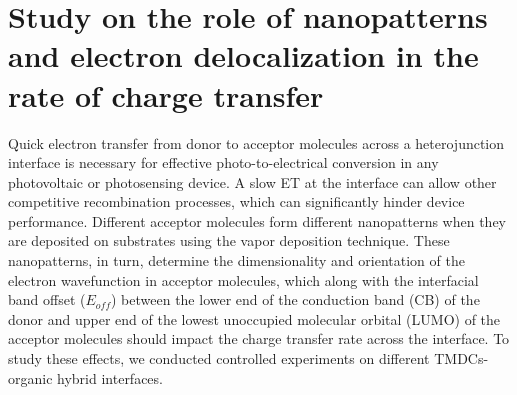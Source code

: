 \documentclass[12pt]{article}
\begin{document}
\section{Study on the role of nanopatterns and electron delocalization in the rate of charge transfer}
Quick electron transfer from donor to acceptor molecules across a heterojunction interface is necessary for effective photo-to-electrical conversion in any photovoltaic or photosensing device. A slow ET at the interface can allow other competitive recombination processes, which can significantly hinder device performance. Different acceptor molecules form different nanopatterns when they are deposited on substrates using the vapor deposition technique. These nanopatterns, in turn, determine the dimensionality and orientation of the electron wavefunction in acceptor molecules, which along with the interfacial band offset ($E_{off}$) between the lower end of the conduction band (CB) of the donor and upper end of the lowest unoccupied molecular orbital (LUMO) of the acceptor molecules should impact the charge transfer rate across the interface. To study these effects, we conducted controlled experiments on different TMDCs-organic hybrid interfaces. 
\end{document}
